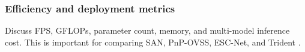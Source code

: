 \subsubsection{Efficiency and deployment metrics}
\label{subsubsec:efficiency-metrics}
Discuss FPS, GFLOPs, parameter count, memory, and multi-model inference cost. This is important for comparing SAN, PnP-OVSS, ESC-Net, and Trident \citep{xu2023san,luo2024pnpovss,lee2025escnet,shi2025trident}.

